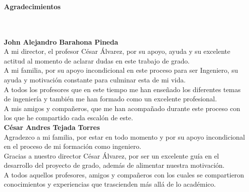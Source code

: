 \newpage{\pagestyle{empty}\cleardoublepage}

\newpage
\thispagestyle{empty} \textbf{}\normalsize
\\\\\\%
\textbf{\LARGE Agradecimientos}
\\\\

\textbf{John Alejandro Barahona Pineda}\\

A mi director, el profesor César Álvarez, por su apoyo, ayuda y su excelente actitud al momento de aclarar dudas en este trabajo de grado.\\

A mi familia, por su apoyo incondicional en este proceso para ser Ingeniero, su ayuda y motivación constante para culminar esta de mi vida.\\

A todos los profesores que en este tiempo me han enseñado los diferentes temas de ingeniería y también me han formado como un excelente profesional.\\

A mis amigos y compañeros, que me han acompañado durante este proceso con los que he compartido cada escalón de este.\\ 

\textbf{César Andres Tejada Torres}\\

Agradezco a mi familia, por estar en todo momento y por su apoyo incondicional en el proceso de mi formación como ingeniero. \\

Gracias a nuestro director César Álvarez, por ser un excelente guía en el desarrollo del proyecto de grado, además de alimentar nuestra motivación.\\

A todos aquellos profesores, amigos y compañeros con los cuales se compartieron conocimientos y experiencias que trascienden más allá de lo académico. \\

\newpage{\pagestyle{empty}\cleardoublepage}
